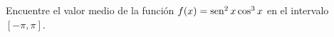 \item Encuentre el valor medio de la función $f(x) = \operatorname{sen}^2 x \cos^3 x$ en el intervalo $[-\pi, \pi]$.
